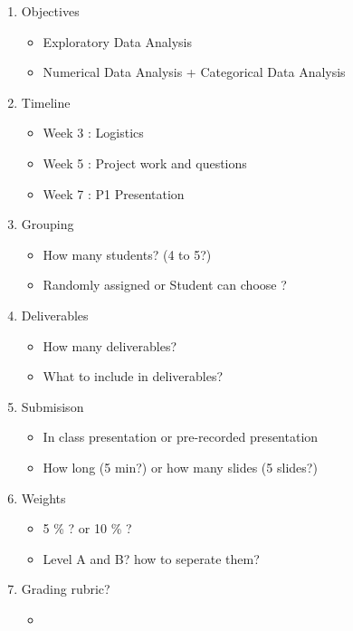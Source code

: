 \documentclass[12pt]{article}
\begin{document}
\begin{enumerate}
    \item Objectives 
    \begin{itemize}
        \item Exploratory Data Analysis 
        \item Numerical Data Analysis + Categorical Data Analysis
    \end{itemize}
    \item Timeline
    \begin{itemize}
        \item Week 3 : Logistics 
        \item Week 5 : Project work and questions
        \item Week 7 : P1 Presentation 
    \end{itemize}

    \item  Grouping 
    \begin{itemize}
        \item How many students? (4 to 5?)
        \item Randomly assigned or Student can choose ? 
    \end{itemize}
    \item Deliverables
    \begin{itemize}
        \item How many deliverables? 
        \item What to include in deliverables? 
    \end{itemize} 
    \item Submisison
    \begin{itemize}
        \item In class presentation or pre-recorded presentation
        \item How long (5 min?) or how many slides (5 slides?)
    \end{itemize}
    \item Weights
    \begin{itemize}
        \item 5 \% ? or 10 \% ?
        \item Level A and B? how to seperate them? 
    \end{itemize}
    \item Grading rubric?
    \begin{itemize}
        \item 
    \end{itemize}


\end{enumerate}
    
\end{document}
